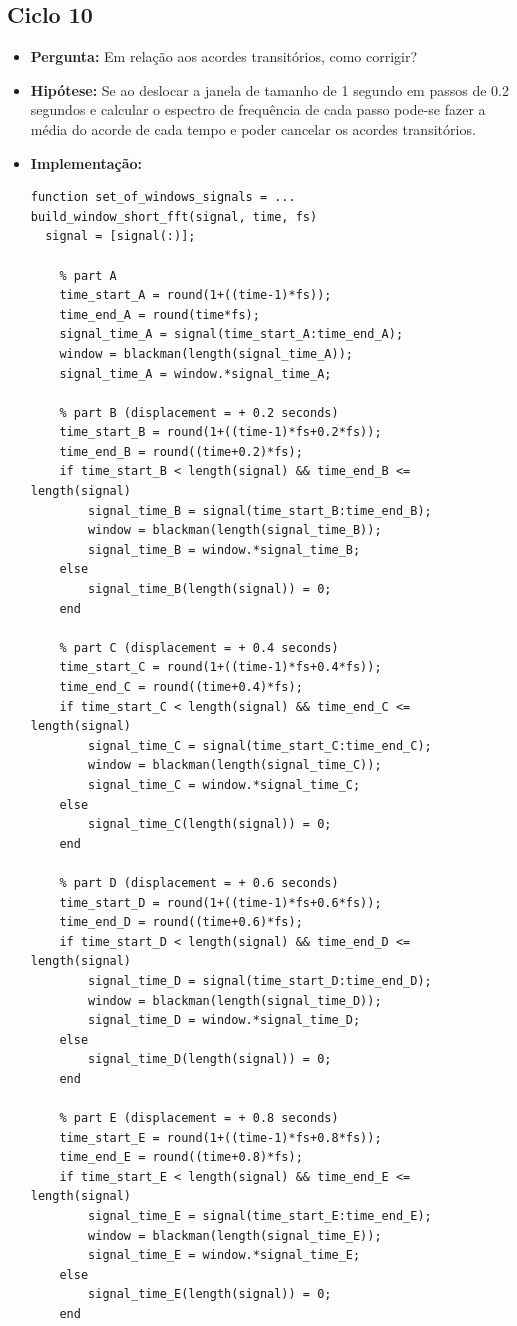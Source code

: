 \subsection{Ciclo 10}
\begin{itemize}
\item \textbf{Pergunta:} Em relação aos acordes transitórios, como corrigir?
\item \textbf{Hipótese:} Se ao deslocar a janela de tamanho de 1 segundo em passos de 0.2 segundos e calcular o espectro de frequência de cada passo pode-se fazer a média do acorde de cada tempo e poder cancelar os acordes transitórios.
\item \textbf{Implementação:}
\begin{lstlisting}
function set_of_windows_signals = ...
build_window_short_fft(signal, time, fs)
  signal = [signal(:)];

    % part A
    time_start_A = round(1+((time-1)*fs));
    time_end_A = round(time*fs);
    signal_time_A = signal(time_start_A:time_end_A);
    window = blackman(length(signal_time_A));
    signal_time_A = window.*signal_time_A;

    % part B (displacement = + 0.2 seconds)
    time_start_B = round(1+((time-1)*fs+0.2*fs));
    time_end_B = round((time+0.2)*fs);
    if time_start_B < length(signal) && time_end_B <= length(signal)
        signal_time_B = signal(time_start_B:time_end_B);
        window = blackman(length(signal_time_B));
        signal_time_B = window.*signal_time_B;
    else
        signal_time_B(length(signal)) = 0;
    end

    % part C (displacement = + 0.4 seconds)
    time_start_C = round(1+((time-1)*fs+0.4*fs));
    time_end_C = round((time+0.4)*fs);
    if time_start_C < length(signal) && time_end_C <= length(signal)
        signal_time_C = signal(time_start_C:time_end_C);
        window = blackman(length(signal_time_C));
        signal_time_C = window.*signal_time_C;
    else
        signal_time_C(length(signal)) = 0;
    end

    % part D (displacement = + 0.6 seconds)
    time_start_D = round(1+((time-1)*fs+0.6*fs));
    time_end_D = round((time+0.6)*fs);
    if time_start_D < length(signal) && time_end_D <= length(signal)
        signal_time_D = signal(time_start_D:time_end_D);
        window = blackman(length(signal_time_D));
        signal_time_D = window.*signal_time_D;
    else
        signal_time_D(length(signal)) = 0;
    end

    % part E (displacement = + 0.8 seconds)
    time_start_E = round(1+((time-1)*fs+0.8*fs));
    time_end_E = round((time+0.8)*fs);
    if time_start_E < length(signal) && time_end_E <= length(signal)
        signal_time_E = signal(time_start_E:time_end_E);
        window = blackman(length(signal_time_E));
        signal_time_E = window.*signal_time_E;
    else
        signal_time_E(length(signal)) = 0;
    end


\end{lstlisting}
\end{itemize}
